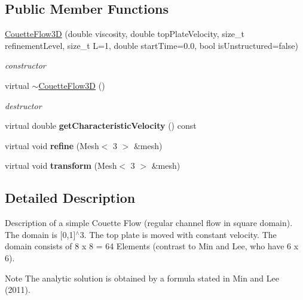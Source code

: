 \subsection*{Public Member Functions}
\begin{DoxyCompactItemize}
\item 
\hyperlink{classnatrium_1_1CouetteFlow3D_acf083268f4190ffe62b01f3dfc77d407}{CouetteFlow3D} (double viscosity, double topPlateVelocity, size\_\-t refinementLevel, size\_\-t L=1, double startTime=0.0, bool isUnstructured=false)
\begin{DoxyCompactList}\small\item\em constructor \item\end{DoxyCompactList}\item 
\hypertarget{classnatrium_1_1CouetteFlow3D_a2d1b9db247ba3e51ed092dab3637a657}{
virtual \hyperlink{classnatrium_1_1CouetteFlow3D_a2d1b9db247ba3e51ed092dab3637a657}{$\sim$CouetteFlow3D} ()}
\label{classnatrium_1_1CouetteFlow3D_a2d1b9db247ba3e51ed092dab3637a657}

\begin{DoxyCompactList}\small\item\em destructor \item\end{DoxyCompactList}\item 
\hypertarget{classnatrium_1_1CouetteFlow3D_a38cc986a0f45a5ec7ef56fefc9e342df}{
virtual double {\bfseries getCharacteristicVelocity} () const }
\label{classnatrium_1_1CouetteFlow3D_a38cc986a0f45a5ec7ef56fefc9e342df}

\item 
\hypertarget{classnatrium_1_1CouetteFlow3D_a593a4537da4996cd7db1ff8184e7cde2}{
virtual void {\bfseries refine} (Mesh$<$ 3 $>$ \&mesh)}
\label{classnatrium_1_1CouetteFlow3D_a593a4537da4996cd7db1ff8184e7cde2}

\item 
\hypertarget{classnatrium_1_1CouetteFlow3D_afb788d67404db5a8949f49ca49d0b6e1}{
virtual void {\bfseries transform} (Mesh$<$ 3 $>$ \&mesh)}
\label{classnatrium_1_1CouetteFlow3D_afb788d67404db5a8949f49ca49d0b6e1}

\end{DoxyCompactItemize}


\subsection{Detailed Description}
Description of a simple Couette Flow (regular channel flow in square domain). The domain is \mbox{[}0,1\mbox{]}$^\wedge$3. The top plate is moved with constant velocity. The domain consists of 8 x 8 = 64 Elements (contrast to Min and Lee, who have 6 x 6). \begin{DoxyNote}{Note}
The analytic solution is obtained by a formula stated in Min and Lee (2011). 
\end{DoxyNote}



